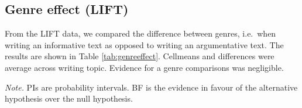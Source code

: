 \clearpage
\makeatletter
\efloat@restorefloats
\makeatother


\begin{appendix}
\section{}
\hypertarget{genre-effect-lift}{%
\subsection{Genre effect (LIFT)}\label{genre-effect-lift}}

From the LIFT data, we compared the difference between genres, i.e.~when
writing an informative text as opposed to writing an argumentative text.
The results are shown in Table \ref{tab:genreeffect}. Cellmeans and
differences were average across writing topic. Evidence for a genre
comparisons was negligible.

\begin{center}
\begin{ThreePartTable}

\begin{TableNotes}[para]
\normalsize{\textit{Note.} PIs are probability intervals. BF is the evidence in favour of the alternative hypothesis over the null hypothesis.}
\end{TableNotes}

\footnotesize{

}
\end{ThreePartTable}
\end{center}
\end{appendix}
